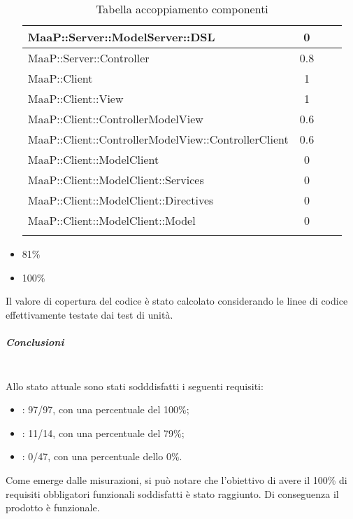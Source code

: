 \begin{itemize}
\begin{longtable}{|p{11cm}|c|c|c|}
\midrule
MaaP::Server::ModelServer::DSL
& 0\\

\midrule
MaaP::Server::Controller
& 0.8\\

\midrule
MaaP::Client
& 1\\

\midrule
MaaP::Client::View
& 1\\

\midrule
MaaP::Client::ControllerModelView
& 0.6\\

\midrule
MaaP::Client::ControllerModelView::ControllerClient
& 0.6\\

\midrule
MaaP::Client::ModelClient
& 0\\

\midrule
MaaP::Client::ModelClient::Services
& 0\\

\midrule
MaaP::Client::ModelClient::Directives
& 0\\

\midrule
MaaP::Client::ModelClient::Model
& 0\\


\bottomrule
\caption{Tabella accoppiamento componenti}
\end{longtable}

\item {}81\%
\item {}100\%
\end{itemize}
Il valore di copertura del codice è stato calcolato considerando le linee di codice effettivamente testate dai test di unità.
\subparagraph{Conclusioni} \hfill\\
Allo stato attuale sono stati sodddisfatti i seguenti requisiti:
\begin{itemize}
\item {}: 97/97, con una percentuale del 100\%;
\item {}: 11/14, con una percentuale del 79\%;
\item {}: 0/47, con una percentuale dello 0\%.
\end{itemize}
Come emerge dalle misurazioni, si può notare che l'obiettivo di avere il 100\% di requisiti obbligatori funzionali soddisfatti è stato raggiunto. Di conseguenza il prodotto è funzionale.\\

